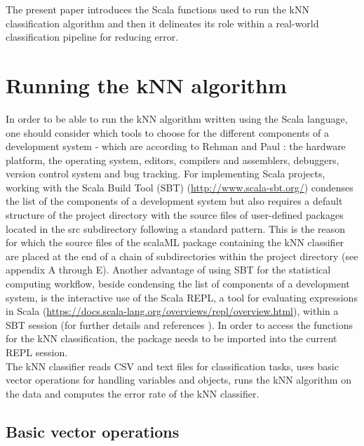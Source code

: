 \documentclass[twoside, 11 p]{article}
\begin{document}
      
The present paper introduces the Scala functions used to run the kNN classification algorithm and then it delineates its role within a real-world classification pipeline for reducing error.    
 
\section{Running the kNN algorithm}

In order to be able to run the kNN algorithm written using the Scala language, one should consider which tools to choose for the different components of a development system -  which are according to Rehman and Paul \citep{rehman_linux_2003}: the hardware platform, the operating system, editors, compilers and assemblers, debuggers, version control system and bug tracking.
For implementing Scala projects, working with the Scala Build Tool (SBT) (\href{http://www.scala-sbt.org/}{http://www.scala-sbt.org/}) condenses the list of the components of a development system but also requires a default structure of the project directory with the source files of user-defined packages located in the src subdirectory \citep{suereth_sbt_2016} following a standard pattern. This is the reason for which the source files of the scalaML package containing the kNN classifier are placed at the end of a chain of subdirectories within the project directory (see appendix A through E). 
Another advantage of using SBT for the statistical computing workflow, beside condensing the list of components of a development system, is the interactive use of the Scala REPL, a tool for evaluating expressions in Scala (\href{https://docs.scala-lang.org/overviews/repl/overview.html}{https://docs.scala-lang.org/overviews/repl/overview.html}), within a SBT session (for further details and references \citep[see]{tesileanu_using_2017}).
In order to access the functions for the kNN classification, the package needs to be imported into the current REPL session.\\


The kNN classifier reads CSV and text files for classification tasks, uses basic vector operations for handling variables and objects, runs the kNN algorithm on the data and computes the error rate of the kNN classifier.

\subsection{Basic vector operations}
\end{document}
